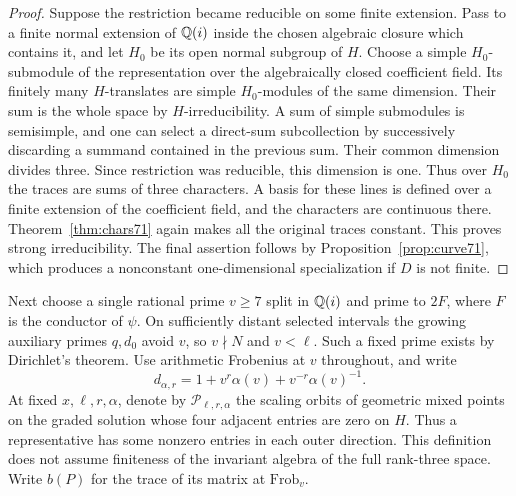 \documentclass[a4paper,11pt]{article}
\theoremstyle{definition}
\theoremstyle{remark}
\numberwithin{equation}{section}
\begin{document}
\begin{proof}
Suppose the restriction became reducible on some finite extension.
Pass to a finite normal extension of \(\mathbb Q(i)\) inside the
chosen algebraic closure which contains it, and let \(H_0\)
be its open normal subgroup of \(H\). Choose a simple
\(H_0\)-submodule of the representation over the algebraically
closed coefficient field. Its finitely many \(H\)-translates
are simple \(H_0\)-modules of the same dimension. Their sum
is the whole space by \(H\)-irreducibility. A sum of simple
submodules is semisimple, and one can select a direct-sum
subcollection by successively discarding a summand contained in
the previous sum. Their common dimension divides three.
Since restriction was reducible, this dimension is one. Thus
over \(H_0\) the traces are sums of three characters. A basis
for these lines is defined over a finite extension of the
coefficient field, and the characters are continuous there.
Theorem~\ref{thm:chars71} again makes all the original traces
constant. This proves strong irreducibility. The final assertion
follows by Proposition~\ref{prop:curve71}, which produces a
nonconstant one-dimensional specialization if \(D\) is not finite.
\end{proof}

Next choose a single rational prime \(v\ge7\) split in
\(\mathbb Q(i)\) and prime to \(2F\), where \(F\) is the conductor of
\(\psi\). On sufficiently distant selected intervals the growing
auxiliary primes \(q,d_0\) avoid \(v\), so \(v\nmid N\) and
\(v<\ell\). Such a fixed prime exists by Dirichlet's theorem.
Use arithmetic Frobenius at \(v\) throughout, and write
\[
    d_{\alpha,r}=1+v^r\alpha(v)+v^{-r}\alpha(v)^{-1}.
\]
At fixed \(x,\ell,r,\alpha\), denote by \(\mathcal P_{\ell,r,\alpha}\)
the scaling orbits of geometric mixed points on the graded
solution whose four adjacent entries are zero on \(H\). Thus a
representative has some nonzero entries in each outer direction.
This definition does not assume finiteness of the invariant
algebra of the full rank-three space. Write \(b(P)\) for the
trace of its matrix at \(\mathrm{Frob}_v\).
\end{document}
